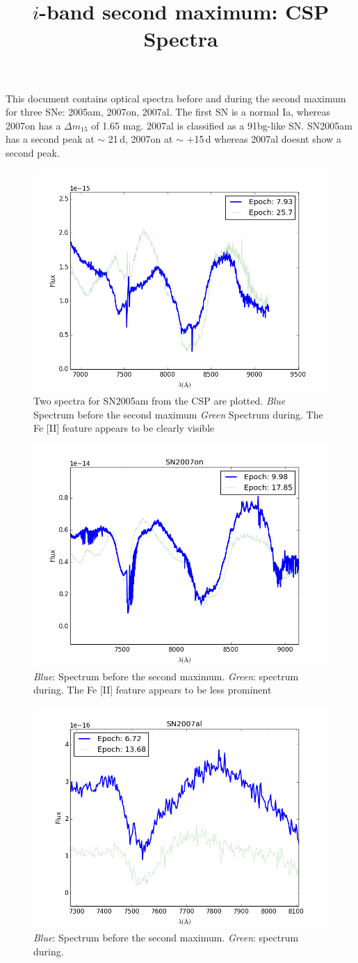 \documentclass{article}
\begin{document}
\title{$i$-band second maximum: CSP Spectra}
\maketitle
This document contains optical spectra before and during the second maximum for three SNe: 2005am, 2007on, 2007al. The first SN is a normal Ia, whereas 2007on has a $\Delta m_{15}$ of 1.65 mag. 2007al is classified as a 91bg-like SN.
SN2005am has a second peak at $\sim$ 21$\,$d, 2007on at $\sim$ +15$\,$d whereas 2007al doesnt show a second peak.
\begin{figure}
\includegraphics[width=.7\textwidth]{../img/05am_cspspec.png}
\caption{Two spectra for SN2005am from the CSP are plotted. \emph{Blue} Spectrum before the second maximum \emph{Green} Spectrum during. The Fe [II] feature appears to be clearly visible}
\end{figure}

\begin{figure}
\includegraphics[width=.7\textwidth]{../img/07on_cspspec.png}
\caption{\emph{Blue}: Spectrum before the second maximum. \emph{Green}: spectrum during. The Fe [II] feature appears to be less prominent}
\end{figure}


\begin{figure}
\includegraphics[width=.7\textwidth]{../img/07al_cspspec.png}
\caption{\emph{Blue}: Spectrum before the second maximum. \emph{Green}: spectrum during.}
\end{figure}
\end{document}

